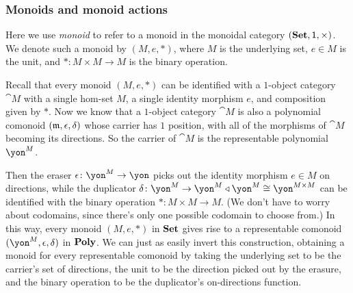 \documentclass[Book-Poly]{subfiles}
\begin{document}
\subsubsection{Monoids and monoid actions}

Here we use \emph{monoid} to refer to a monoid in the monoidal category $(\mathbf{Set},\textsf{1},\times)$.
We denote such a monoid by $(M,e,*)$, where $M$ is the underlying set, $e\in M$ is the unit, and $*\colon M\times M\to M$ is the binary operation.

\begin{example}\label{ex.monoids}
Recall that every monoid $(M,e,*)$ can be identified with a $1$-object category $\cat{M}$ with a single hom-set $M$, a single identity morphism $e$, and composition given by $*$.
Now we know that a $1$-object category $\cat{M}$ is also a polynomial comonoid $(\mathfrak{m},\epsilon,\delta)$ whose carrier has $1$ position, with all of the morphisms of $\cat{M}$ becoming its directions.
So the carrier of $\cat{M}$ is the representable polynomial $\yon^M$.

Then the eraser $\epsilon\colon\yon^M\to\yon$ picks out the identity morphism $e\in M$ on directions, while the duplicator $\delta\colon\yon^M\to\yon^M\tri\yon^M\iso\yon^{M\times M}$ can be identified with the binary operation $*\colon M\times M\to M$.
(We don't have to worry about codomains, since there's only one possible codomain to choose from.)
In this way, every monoid $(M,e,*)$ in $\mathbf{Set}$ gives rise to a representable comonoid $(\yon^M,\epsilon,\delta)$ in $\mathbf{Poly}$.
We can just as easily invert this construction, obtaining a monoid for every representable comonoid by taking the underlying set to be the carrier's set of directions, the unit to be the direction picked out by the erasure, and the binary operation to be the duplicator's on-directions function.


\end{example}
\end{document}
